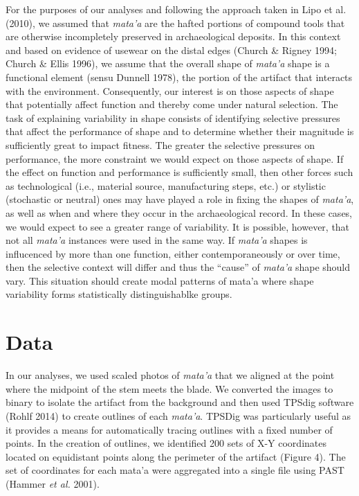 \documentclass[]{article}
\begin{document}
For the purposes of our analyses and following the approach taken in
Lipo et al. (2010), we assumed that \emph{mata'a} are the hafted
portions of compound tools that are otherwise incompletely preserved in
archaeological deposits. In this context and based on evidence of
usewear on the distal edges (Church \& Rigney 1994; Church \& Ellis
1996), we assume that the overall shape of \emph{mata'a} shape is a
functional element (sensu Dunnell 1978), the portion of the artifact
that interacts with the environment. Consequently, our interest is on
those aspects of shape that potentially affect function and thereby come
under natural selection. The task of explaining variability in shape
consists of identifying selective pressures that affect the performance
of shape and to determine whether their magnitude is sufficiently great
to impact fitness. The greater the selective pressures on performance,
the more constraint we would expect on those aspects of shape. If the
effect on function and performance is sufficiently small, then other
forces such as technological (i.e., material source, manufacturing
steps, etc.) or stylistic (stochastic or neutral) ones may have played a
role in fixing the shapes of \emph{mata'a}, as well as when and where
they occur in the archaeological record. In these cases, we would expect
to see a greater range of variability. It is possible, however, that not
all \emph{mata'a} instances were used in the same way. If \emph{mata'a}
shapes is influcenced by more than one function, either
contemporaneously or over time, then the selective context will differ
and thus the ``cause'' of \emph{mata'a} shape should vary. This
situation should create modal patterns of mata'a where shape variability
forms statistically distinguishablke groups.

\section{Data}\label{data}

In our analyses, we used scaled photos of \emph{mata'a} that we aligned
at the point where the midpoint of the stem meets the blade. We
converted the images to binary to isolate the artifact from the
background and then used TPSdig software (Rohlf 2014) to create outlines
of each \emph{mata'a}. TPSDig was particularly useful as it provides a
means for automatically tracing outlines with a fixed number of points.
In the creation of outlines, we identified 200 sets of X-Y coordinates
located on equidistant points along the perimeter of the artifact
(Figure 4). The set of coordinates for each mata'a were aggregated into
a single file using PAST (Hammer \emph{et al.} 2001).
\end{document}
